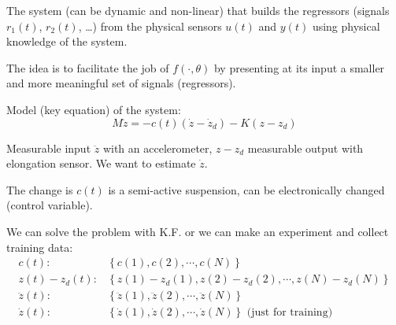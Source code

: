 
The system (can be dynamic and non-linear) that builds the regressors (signals $r_1(t)$, $r_2(t)$, \ldots) from the physical sensors $u(t)$ and $y(t)$ using physical knowledge of the system.

The idea is to facilitate the job of $f(\cdot, \theta)$ by presenting at its input a smaller and more meaningful set of signals (regressors).

\begin{exercise}
    Model (key equation) of the system:
    \[
        M\ddot{z} = -c(t)(\dot{z}-\dot{z}_d) - K(z-z_d)
    \]

    Measurable input $\ddot{z}$ with an accelerometer, $z-z_d$ measurable output with elongation sensor.
    We want to estimate $\dot{z}$.

    The change is $c(t)$ is a semi-active suspension, can be electronically changed (control variable).

    We can solve the problem with K.F. or we can make an experiment and collect training data:
    \begin{align*}
        c(t)        : & \left\{ c(1), c(2), \cdots, c(N) \right\} \\
        z(t)-z_d(t) : & \left\{ z(1)-z_d(1), z(2)-z_d(2), \cdots, z(N)-z_d(N) \right\} \\
        \ddot{z}(t) : & \left\{ \ddot{z}(1), \ddot{z}(2), \cdots, \ddot{z}(N) \right\} \\
        \dot{z}(t)  : & \left\{ \dot{z}(1), \dot{z}(2), \cdots, \dot{z}(N) \right\} \text{ (just for training)} \\
    \end{align*}
\end{exercise}
